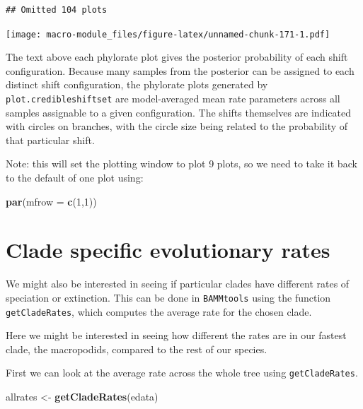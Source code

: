\documentclass[]{book}
\newenvironment{Shaded}{\begin{snugshade}}{\end{snugshade}}
\newcommand{\KeywordTok}[1]{\textcolor[rgb]{0.13,0.29,0.53}{\textbf{{#1}}}}
\newcommand{\DataTypeTok}[1]{\textcolor[rgb]{0.13,0.29,0.53}{{#1}}}
\newcommand{\DecValTok}[1]{\textcolor[rgb]{0.00,0.00,0.81}{{#1}}}
\newcommand{\StringTok}[1]{\textcolor[rgb]{0.31,0.60,0.02}{{#1}}}
\newcommand{\NormalTok}[1]{{#1}}
\begin{document}
\begin{verbatim}
## Omitted 104 plots
\end{verbatim}

\texttt{[image: macro-module\_files/figure-latex/unnamed-chunk-171-1.pdf]}

The text above each phylorate plot gives the posterior probability of
each shift configuration. Because many samples from the posterior can be
assigned to each distinct shift configuration, the phylorate plots
generated by \texttt{plot.credibleshiftset} are model-averaged mean rate
parameters across all samples assignable to a given configuration. The
shifts themselves are indicated with circles on branches, with the
circle size being related to the probability of that particular shift.

Note: this will set the plotting window to plot 9 plots, so we need to
take it back to the default of one plot using:

\begin{Shaded}
\begin{Highlighting}[]
\KeywordTok{par}\NormalTok{(}\DataTypeTok{mfrow =} \KeywordTok{c}\NormalTok{(}\DecValTok{1}\NormalTok{,}\DecValTok{1}\NormalTok{))}
\end{Highlighting}
\end{Shaded}

\section{Clade specific evolutionary
rates}\label{clade-specific-evolutionary-rates}

We might also be interested in seeing if particular clades have
different rates of speciation or extinction. This can be done in
\texttt{BAMMtools} using the function \texttt{getCladeRates}, which
computes the average rate for the chosen clade.

Here we might be interested in seeing how different the rates are in our
fastest clade, the macropodids, compared to the rest of our species.

First we can look at the average rate across the whole tree using
\texttt{getCladeRates}.

\begin{Shaded}
\begin{Highlighting}[]
\NormalTok{allrates <-}\StringTok{ }\KeywordTok{getCladeRates}\NormalTok{(edata)}
\end{Highlighting}
\end{Shaded}
\end{document}

